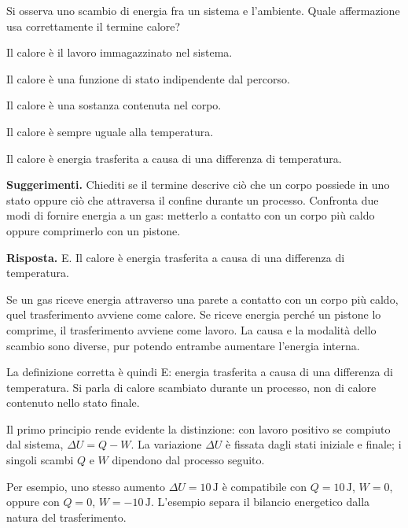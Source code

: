 \documentclass[11pt,a4paper]{article}
\begin{document}
\newpage
\begin{samepage}
\par\smallskip
Si osserva uno scambio di energia fra un sistema e l’ambiente. Quale affermazione usa correttamente il termine calore?\par


\begin{list}{}{\setlength{\leftmargin}{1.4em}\setlength{\itemsep}{.1em}\setlength{\parsep}{0pt}}\small
\item[A.] Il calore è il lavoro immagazzinato nel sistema.
\item[B.] Il calore è una funzione di stato indipendente dal percorso.
\item[C.] Il calore è una sostanza contenuta nel corpo.
\item[D.] Il calore è sempre uguale alla temperatura.
\item[E.] Il calore è energia trasferita a causa di una differenza di temperatura.
\end{list}
{\small\textbf{Suggerimenti.} Chiediti se il termine descrive ciò che un corpo possiede in uno stato oppure ciò che attraversa il confine durante un processo. Confronta due modi di fornire energia a un gas: metterlo a contatto con un corpo più caldo oppure comprimerlo con un pistone.\par}
\medskip\noindent\textbf{Risposta.} E. Il calore è energia trasferita a causa di una differenza di temperatura.\par


Se un gas riceve energia attraverso una parete a contatto con un corpo più caldo, quel trasferimento avviene come calore. Se riceve energia perché un pistone lo comprime, il trasferimento avviene come lavoro. La causa e la modalità dello scambio sono diverse, pur potendo entrambe aumentare l’energia interna.\par

La definizione corretta è quindi E: energia trasferita a causa di una differenza di temperatura. Si parla di calore scambiato durante un processo, non di calore contenuto nello stato finale.\par

Il primo principio rende evidente la distinzione: con lavoro positivo se compiuto dal sistema, \(\Delta U=Q-W\). La variazione \(\Delta U\) è fissata dagli stati iniziale e finale; i singoli scambi \(Q\) e \(W\) dipendono dal processo seguito.\par

Per esempio, uno stesso aumento \(\Delta U=10\,\mathrm J\) è compatibile con \(Q=10\,\mathrm J\), \(W=0\), oppure con \(Q=0\), \(W=-10\,\mathrm J\). L’esempio separa il bilancio energetico dalla natura del trasferimento.\par

\end{samepage}
\end{document}
